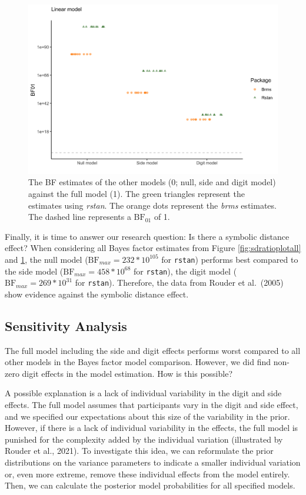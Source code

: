 \documentclass[
  english,
  doc,floatsintext]{apa6}
\begin{document}
\begin{figure}[H]

\includegraphics[width=0.7\linewidth]{Images/Fig17_normalbfplot01} \hfill{}

\caption{The BF estimates of the other models (0; null, side and digit model) against the full model (1). The green triangles represent the estimates using \textit{rstan}. The orange dots represent the \textit{brms} estimates. The dashed line represents a $\text{BF}_{01}$ of 1. }\label{fig:bsbfestimatesbrmsrstan}
\end{figure}

Finally, it is time to answer our research question: Is there a symbolic distance effect? When considering all Bayes factor estimates from Figure \ref{fig:sdratioplotall} and \ref{fig:bsbfestimatesbrmsrstan}, the null model (\(\text{BF}_{max} = 232 * 10^{105}\) for \texttt{rstan}) performs best compared to the side model (\(\text{BF}_{max} = 458 * 10^{68}\) for \texttt{rstan}), the digit model (\(\text{BF}_{max} = 269 * 10^{31}\) for \texttt{rstan}). Therefore, the data from Rouder et al.~(2005) show evidence against the symbolic distance effect.

\hypertarget{sensitivity-analysis}{%
\subsection{Sensitivity Analysis}\label{sensitivity-analysis}}

The full model including the side and digit effects performs worst compared to all other models in the Bayes factor model comparison. However, we did find non-zero digit effects in the model estimation. How is this possible?

A possible explanation is a lack of individual variability in the digit and side effects. The full model assumes that participants vary in the digit and side effect, and we specified our expectations about this size of the variability in the prior. However, if there is a lack of individual variability in the effects, the full model is punished for the complexity added by the individual variation (illustrated by Rouder et al., 2021). To investigate this idea, we can reformulate the prior distributions on the variance parameters to indicate a smaller individual variation or, even more extreme, remove these individual effects from the model entirely. Then, we can calculate the posterior model probabilities for all specified models.
\end{document}
